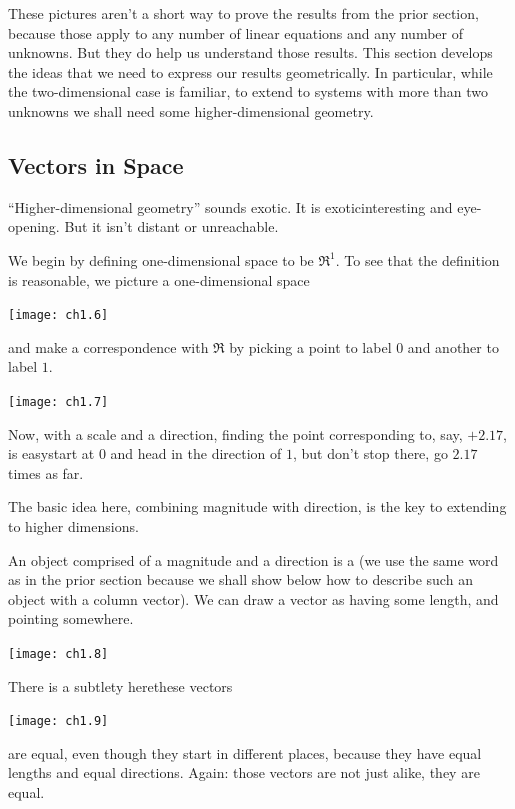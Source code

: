 These pictures aren't a short way to prove
the results from the prior section, because those apply
to any number of linear equations and any number of unknowns. 
But they do help us understand those results.
This section develops the ideas that we need to
express our results geometrically. 
In particular, while
the two-dimensional case is familiar, to extend to systems with
more than two unknowns we shall need some higher-dimensional geometry.














\subsection{Vectors in Space}
``Higher-dimensional geometry'' sounds exotic.
It is exotic\Dash interesting and eye-opening.
But it isn't distant or unreachable.

We begin by defining one-dimensional space to be \( \Re^1 \).
To see that the definition is reasonable, 
we picture a one-dimensional space
\begin{center}
  \texttt{[image: ch1.6]}
\end{center}
and make a correspondence with \( \Re \) by
picking a point to label $0$ and another to label $1$.
\begin{center}
  \texttt{[image: ch1.7]}
\end{center}
Now, with a scale and a direction,
finding the point corresponding to, say,
\( +2.17 \), is easy\Dash start at \( 0 \) and head in the direction of \( 1 \),
but don't stop there, go \( 2.17 \) times as far.

The basic idea here, combining magnitude with direction, is the
key to extending to higher dimensions.

An object comprised of a magnitude and a direction is a
(we use the same word as in the prior section because we shall show
below how to describe such
an object with a column vector).
We can draw a vector as having some length, and pointing somewhere.
\begin{center}
  \texttt{[image: ch1.8]}
\end{center}
There is a subtlety here\Dash these vectors
\begin{center}
  \texttt{[image: ch1.9]}
\end{center}
are equal, even though they start in different places,
because they have equal lengths and equal directions.
Again: those vectors are not just alike, they are equal.

